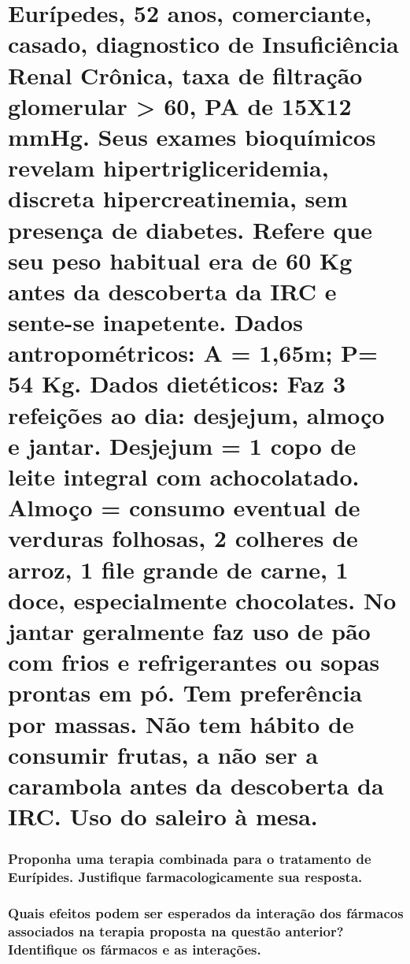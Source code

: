 \documentclass[11pt,notitlepage]{article}
\begin{document}
\part{Eurípedes, 52 anos, comerciante, casado, diagnostico de Insuficiência Renal Crônica, taxa de filtração glomerular > 60, PA de 15X12 mmHg. Seus exames bioquímicos revelam hipertrigliceridemia, discreta hipercreatinemia, sem presença de diabetes. Refere que seu peso habitual era de 60 Kg antes da descoberta da IRC e sente-se inapetente. \textbf{Dados antropométricos}: A = 1,65m; P= 54 Kg. \textbf{Dados dietéticos}: Faz 3 refeições ao dia: desjejum, almoço e jantar. Desjejum = 1 copo de leite integral com achocolatado. Almoço = consumo eventual de verduras folhosas, 2 colheres de arroz, 1 file grande de carne, 1 doce, especialmente chocolates. No jantar geralmente faz uso de pão com frios e refrigerantes ou sopas prontas em pó. Tem preferência por massas. Não tem hábito de consumir frutas, a não ser a carambola antes da descoberta da IRC. Uso do saleiro à mesa.}
\vspace{0.5cm}

\section{Proponha uma terapia combinada para o tratamento de Eurípides. Justifique farmacologicamente sua resposta. }
\noindent\makebox[\linewidth]{\rule{\textwidth}{0.5pt}}
\noindent\makebox[\linewidth]{\rule{\textwidth}{0.5pt}}
\noindent\makebox[\linewidth]{\rule{\textwidth}{0.5pt}}
\noindent\makebox[\linewidth]{\rule{\textwidth}{0.5pt}}
\noindent\makebox[\linewidth]{\rule{\textwidth}{0.5pt}}
\noindent\makebox[\linewidth]{\rule{\textwidth}{0.5pt}}
\noindent\makebox[\linewidth]{\rule{\textwidth}{0.5pt}}
\noindent\makebox[\linewidth]{\rule{\textwidth}{0.5pt}}
\noindent\makebox[\linewidth]{\rule{\textwidth}{0.5pt}}
\noindent\makebox[\linewidth]{\rule{\textwidth}{0.5pt}}
\noindent\makebox[\linewidth]{\rule{\textwidth}{0.5pt}}
\noindent\makebox[\linewidth]{\rule{\textwidth}{0.5pt}}
\noindent\makebox[\linewidth]{\rule{\textwidth}{0.5pt}}
\vspace{0.5cm}

\section{Quais efeitos podem ser esperados da interação dos fármacos associados na terapia proposta na questão anterior? Identifique os fármacos e as interações.}
\noindent\makebox[\linewidth]{\rule{\textwidth}{0.5pt}}
\noindent\makebox[\linewidth]{\rule{\textwidth}{0.5pt}}
\noindent\makebox[\linewidth]{\rule{\textwidth}{0.5pt}}
\noindent\makebox[\linewidth]{\rule{\textwidth}{0.5pt}}
\noindent\makebox[\linewidth]{\rule{\textwidth}{0.5pt}}
\noindent\makebox[\linewidth]{\rule{\textwidth}{0.5pt}}
\noindent\makebox[\linewidth]{\rule{\textwidth}{0.5pt}}
\noindent\makebox[\linewidth]{\rule{\textwidth}{0.5pt}}
\noindent\makebox[\linewidth]{\rule{\textwidth}{0.5pt}}
\noindent\makebox[\linewidth]{\rule{\textwidth}{0.5pt}}
\noindent\makebox[\linewidth]{\rule{\textwidth}{0.5pt}}
\noindent\makebox[\linewidth]{\rule{\textwidth}{0.5pt}}
\noindent\makebox[\linewidth]{\rule{\textwidth}{0.5pt}}
\vspace{0.5cm}
\end{document}
